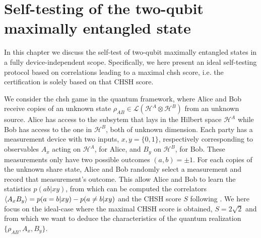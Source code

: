 \chapter{Self-testing of the two-qubit maximally entangled state}

In this chapter we discuss the self-test of two-qubit maximally entangled states in a fully device-independent scope.
Specifically, we here present an ideal self-testing protocol based on correlations leading to a maximal \acrshort{chsh} score, i.e. the certification is solely based on that CHSH score.

\medbreak 

We consider the \acrshort{chsh} game in the quantum framework, where Alice and Bob receive copies of an unknown state $\rho_{AB} \in \mathcal{L}(\mathscr{H}^A \otimes \mathscr{H}^B)$ from an unknown source.
Alice has access to the subsytem that lays in the Hilbert space $\mathscr{H}^A$ while Bob has access to the one in $\mathscr{H}^B$, both of unknown dimension.
Each party has a measurement device with two inputs, $x,y=\{0,1\}$, respectively corresponding to observables $A_x$ acting on $\mathscr{H}^A$, for Alice, and $B_y$ on $\mathscr{H}^B$, for Bob.
These measurements only have two possible outcomes $(a,b)=\pm1$.
For each copies of the unknown share state, Alice and Bob randomly select a measurement and record that measurement's outcome. 
This allow Alice and Bob to learn the statistics $p(ab|xy)$, from which can be computed the correlators $\langle {A_x B_y} \rangle = p(a=b|xy)-p(a\neq b| xy)$ and the CHSH score $S$ following . 
We here focus on the ideal-case where the maximal CHSH score is obtained, $S=2\sqrt{2}$ and from which we want to deduce the characteristics of the quantum realization $\{\rho_{AB},A_x,B_y\}$.

\medbreak

